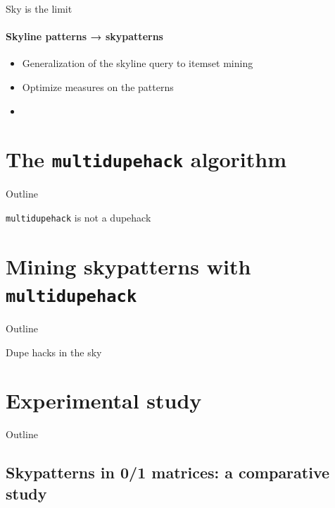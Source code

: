 \documentclass{beamer}
\newcommand{\mdh}{\texttt{multi\-dupe\-hack}}
\begin{document}
\begin{frame}{Sky is the limit}
  \framesubtitle{Skyline patterns → skypatterns}
  \begin{itemize}
  \item Generalization of the skyline query to itemset mining
  \item Optimize measures on the patterns
  \item
  \end{itemize}
\end{frame}

\section{The \mdh{} algorithm}
\begin{frame}{Outline}
  \tableofcontents[currentsection]
\end{frame}

\begin{frame}{\mdh{} is not a dupehack}
  
\end{frame}

\section{Mining skypatterns with \mdh{}}
\begin{frame}{Outline}
  \tableofcontents[currentsection]
\end{frame}

\begin{frame}{Dupe hacks in the sky}
  
\end{frame}

\section{Experimental study}
\begin{frame}{Outline}
  \tableofcontents[currentsection]
\end{frame}

\subsection{Skypatterns in 0/1 matrices: a comparative study}
\end{document}
